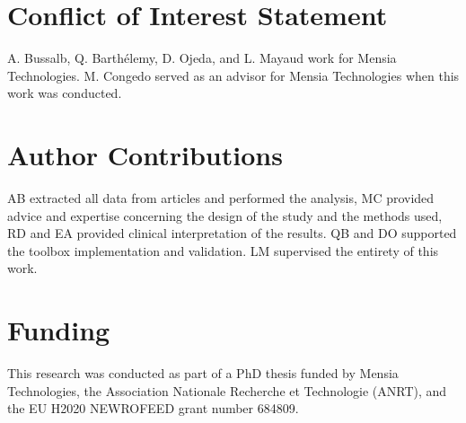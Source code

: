 
\section*{Conflict of Interest Statement}
A. Bussalb, Q. Barth\'elemy, D. Ojeda, and L. Mayaud work for Mensia Technologies.
M. Congedo served as an advisor for Mensia Technologies when this work was conducted.  

\section*{Author Contributions}
AB extracted all data from articles and performed the analysis, MC provided advice and expertise
concerning the design of the study and the methods used, RD and EA 
provided clinical interpretation of the results. QB and DO supported the toolbox implementation
and validation. LM supervised the entirety of this work. 

\section*{Funding}
This research was conducted as part of a PhD thesis funded by Mensia Technologies, the 
Association Nationale Recherche et Technologie (ANRT), and the EU H2020 NEWROFEED grant number 684809.

